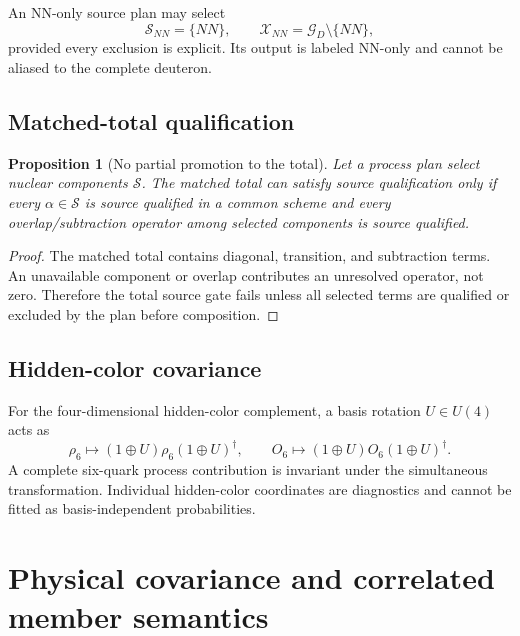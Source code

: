 \documentclass[11pt]{article}
\newtheorem{proposition}[definition]{Proposition}
\begin{document}
An NN-only source plan may select
\begin{equation}
 \mathcal S_{NN}=\{NN\},
 \qquad
 \mathcal X_{NN}=\mathcal G_D\setminus\{NN\},
 \label{eq:nn-only-plan}
\end{equation}
provided every exclusion is explicit.  Its output is labeled NN-only and cannot be aliased to the complete deuteron.

\subsection{Matched-total qualification}

\begin{proposition}[No partial promotion to the total]
Let a process plan select nuclear components \(\mathcal S\).  The matched total can satisfy source qualification only if every \(\alpha\in\mathcal S\) is source qualified in a common scheme and every overlap/subtraction operator among selected components is source qualified.
\end{proposition}

\begin{proof}
The matched total contains diagonal, transition, and subtraction terms.  An unavailable component or overlap contributes an unresolved operator, not zero.  Therefore the total source gate fails unless all selected terms are qualified or excluded by the plan before composition.
\end{proof}

\subsection{Hidden-color covariance}

For the four-dimensional hidden-color complement, a basis rotation \(U\in U(4)\) acts as
\begin{equation}
 \rho_6\mapsto(1\oplus U)\rho_6(1\oplus U)^\dagger,
 \qquad
 O_6\mapsto(1\oplus U)O_6(1\oplus U)^\dagger.
 \label{eq:hidden-rotation}
\end{equation}
A complete six-quark process contribution is invariant under the simultaneous transformation.  Individual hidden-color coordinates are diagnostics and cannot be fitted as basis-independent probabilities.

\section{Physical covariance and correlated member semantics}
\label{sec:covariance}
\end{document}
